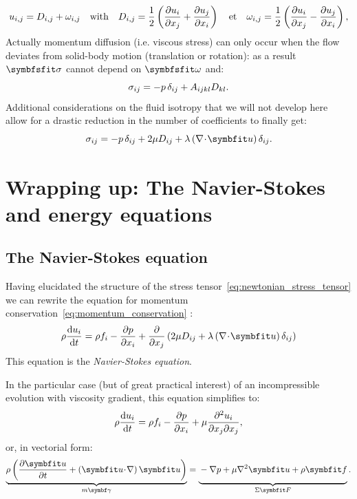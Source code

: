 $$
u_{i,j} = D_{i,j} + \omega_{i,j} \quad \text{with}\quad 
D_{i,j} = \frac{1}{2}\left(\frac{\partial \vphantom{u_j}u_i}{\partial x_j}+\frac{\partial u_j}{\partial x_i}\right) \quad\text{et}\quad
\omega_{i,j}= \frac{1}{2}\left(\frac{\partial \vphantom{u_j}u_i}{\partial x_j}-\frac{\partial u_j}{\partial x_i}\right),
$$
Actually momentum diffusion (i.e. viscous stress) can only occur when the flow deviates from solid-body motion (translation or rotation): as a result $\symbfsfit \sigma$ cannot depend on $\symbfsfit \omega$ and:
\begin{equation}
\sigma_{ij} = -p\, \delta_{ij} + A_{ijkl} D_{kl}.
\end{equation}
Additional considerations on the fluid isotropy that we will not develop here allow for a drastic reduction in the number of coefficients to finally get:
\begin{equation}
\sigij = -p \,\delij + 2 \mu D_{ij} + \lambda \lp\nabla\!\cdot\!\bu\rp \delij.
\label{eq:newtonian_stress_tensor}
\end{equation}

\section{Wrapping up: The Navier-Stokes and energy equations}
\subsection{The Navier-Stokes equation}
Having elucidated the structure of the stress tensor~\eqref{eq:newtonian_stress_tensor} we can rewrite the equation for momentum conservation~\eqref{eq:momentum_conservation} :
\begin{equation}
\rho \dd{u_i}{t} =  \rho f_i  - \pd{p}{x_i} + \pd{}{x_j} \lp 2 \mu D_{ij} + \lambda \lp\nabla\!\cdot\!\bu\rp \delij \rp
\end{equation}
This equation is the \textit{Navier-Stokes equation}.

In the particular case (but of great practical interest) of an incompressible evolution with viscosity gradient, this equation simplifies to:
\begin{equation}
\rho \frac{\mathrm d u_i}{\mathrm d t} =  \rho f_i  - \frac{\partial p}{\partial x_i} + \mu \frac{\partial^2 u_i}{\partial x_j\partial x_j},
\end{equation}
or, in vectorial form:
\begin{equation}
\underbrace{\rho \lp\pd{\bu}{t} + \lp\bu\!\cdot\!\nabla\rp\bu\rp}_{m\symbf\gamma} = \underbrace{\vphantom{\lp\pd{\bu}{t}\rp}-\nabla p + \mu \nabla^2 \bu + \rho \bff}_{\Sigma \bF}.
\end{equation}

